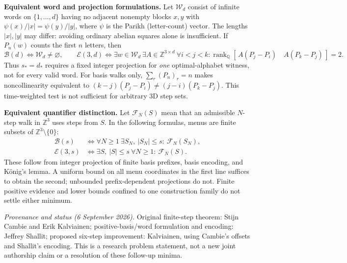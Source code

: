 \documentclass[10pt]{article}
\newcommand{\Z}{\mathbb Z}
\newcommand{\Q}{\mathbb Q}
\newcommand{\B}{\mathcal B}
\newcommand{\E}{\mathcal E}
\newcommand{\F}{\mathcal F}
\begin{document}
\textbf{Equivalent word and projection formulations.}
Let $\mathcal W_d$ consist of infinite words on $\{1,\ldots,d\}$ having no
adjacent nonempty blocks $x,y$ with
$\psi(x)/|x|=\psi(y)/|y|$, where $\psi$ is the Parikh (letter-count) vector.
The lengths $|x|,|y|$ may differ: avoiding ordinary abelian squares alone
is insufficient. If $P_n(w)$ counts the first $n$ letters, then
\[
 \B(d)\iff\mathcal W_d\ne\varnothing,\qquad
 \E(3,d)\iff
 \exists w\in\mathcal W_d\ \exists A\in\Z^{3\times d}\ \forall i<j<k:
 \operatorname{rank}_{\Q}
 [\,A(P_j-P_i)\quad A(P_k-P_j)\,]=2.
\]
Thus $s_*=d_*$ requires a fixed integer projection for \emph{one}
optimal-alphabet witness, not for every valid word.
For basis walks only, $\sum_r(P_n)_r=n$ makes noncollinearity equivalent to
$(k-j)(P_j-P_i)\ne(j-i)(P_k-P_j)$.
This time-weighted test is not sufficient for arbitrary 3D step sets.

\textbf{Equivalent quantifier distinction.}
Let $\F_N(S)$ mean that an admissible $N$-step walk in $\Z^3$ uses steps
from $S$. In the following formulas, menus are finite subsets of
$\Z^3\setminus\{0\}$:
\[
 \boxed{\begin{aligned}
 \B(s)&\iff \forall N\ge1\ \exists S_N,\ |S_N|\le s:\ \F_N(S_N),\\
 \E(3,s)&\iff \exists S,\ |S|\le s\ \forall N\ge1:\ \F_N(S).
 \end{aligned}}
\]
These follow from integer projection of finite basis prefixes, basis
encoding, and K\"onig's lemma. A uniform bound on all menu coordinates in
the first line suffices to obtain the second; unbounded prefix-dependent
projections do not. Finite positive evidence and lower bounds confined to
one construction family do not settle either minimum.

\vfill
{\footnotesize\textit{Provenance and status (6 September 2026).}
Original finite-step theorem: Stijn Cambie and Erik Kalviainen;
positive-basis/word formulation and encoding: Jeffrey Shallit;
proposed six-step improvement: Kalviainen, using Cambie's offsets and
Shallit's encoding. This is a research problem statement, not a new joint
authorship claim or a resolution of these follow-up minima.}
\end{document}
